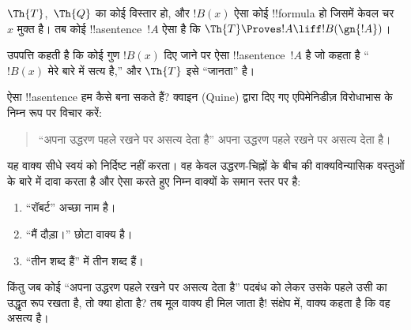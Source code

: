 \documentclass[../../../include/open-logic-section]{subfiles}
\begin{document}
\begin{lem}
$\Th{T}$,~$\Th{Q}$ का कोई विस्तार हो, और $!B(x)$ ऐसा कोई !!{formula} हो
जिसमें केवल चर~$x$ मुक्त है। तब कोई !!a{sentence}~$!A$ ऐसा है कि
$\Th{T} \Proves!A \liff !B(\gn{!A})$।
\end{lem}

उपपत्ति कहती है कि कोई गुण $!B(x)$ दिए जाने पर ऐसा !!a{sentence}~$!A$ है
जो कहता है ``$!B(x)$ मेरे बारे में सत्य है,'' और $\Th{T}$ इसे ``जानता''
है।

ऐसा !!a{sentence} हम कैसे बना सकते हैं? क्वाइन (Quine) द्वारा दिए गए
एपिमेनिडीज़ विरोधाभास के निम्न रूप पर विचार करें:
\begin{quote}
``अपना उद्धरण पहले रखने पर असत्य देता है'' अपना उद्धरण पहले रखने पर असत्य
देता है।
\end{quote}
यह वाक्य सीधे स्वयं को निर्दिष्ट नहीं करता। वह केवल उद्धरण-चिह्नों के बीच
की वाक्यविन्यासिक वस्तुओं के बारे में दावा करता है और ऐसा करते हुए निम्न
वाक्यों के समान स्तर पर है:
\begin{enumerate}
\item ``रॉबर्ट'' अच्छा नाम है।
\item ``मैं दौड़ा।'' छोटा वाक्य है।
\item ``तीन शब्द हैं'' में तीन शब्द हैं।
\end{enumerate}
किंतु जब कोई ``अपना उद्धरण पहले रखने पर असत्य देता है'' पदबंध को लेकर उसके
पहले उसी का उद्धृत रूप रखता है, तो क्या होता है? तब मूल वाक्य ही मिल जाता
है!{} संक्षेप में, वाक्य कहता है कि वह असत्य है।
\end{document}
